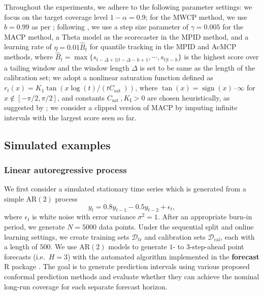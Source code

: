 \documentclass[
  11pt,
  a4paper,
]{article}
\theoremstyle{plain}
\theoremstyle{remark}
\begin{document}
Throughout the experiments, we adhere to the following parameter
settings: we focus on the target coverage level \(1-\alpha=0.9\); for
the MWCP method, we use \(b=0.99\) as per \textcite{barber2023};
following \textcite{angelopoulos2024}, we use a step size parameter of
\(\gamma=0.005\) for the MACP method, a Theta model as the scorecaster
in the MPID method, and a learning rate of \(\eta=0.01\hat{B}_t\) for
quantile tracking in the MPID and AcMCP methods, where
\(\hat{B}_t=\max\{s_{t-\Delta+1|t-\Delta-h+1},\cdots,s_{t|t-h}\}\) is
the highest score over a tailing window and the window length \(\Delta\)
is set to be same as the length of the calibration set; we adopt a
nonlinear saturation function defined as
\(r_t(x)=K_1 \tan \left(x \log (t) /\left(t C_{\text {sat }}\right)\right)\),
where \(\tan (x)=\operatorname{sign}(x) \cdot \infty\) for
\(x \notin[-\pi / 2, \pi / 2]\), and constants
\(C_{\text {sat }}, K_{\mathrm{I}}>0\) are chosen heuristically, as
suggested by \textcite{angelopoulos2024}; we consider a clipped version
of MACP by imputing infinite intervals with the largest score seen so
far.

\subsection{Simulated examples}\label{simulated-examples}

\subsubsection{Linear autoregressive
process}\label{linear-autoregressive-process}

We first consider a simulated stationary time series which is generated
from a simple AR\((2)\) process \[
y_t = 0.8y_{t-1} - 0.5y_{t-2} + \epsilon_t,
\] where \(\epsilon_t\) is white noise with error variance
\(\sigma^2 = 1\). After an appropriate burn-in period, we generate
\(N=5000\) data points. Under the sequential split and online learning
settings, we create training sets \(\mathcal{D}_{\text{tr}}\) and
calibration sets \(\mathcal{D}_{\text{cal}}\), each with a length of
\(500\). We use AR\((2)\) models to generate \(1\)- to \(3\)-step-ahead
point forecasts (i.e.~\(H=3\)) with the automated algorithm implemented
in the \textbf{forecast} R package \autocite{hyndman2024}. The goal is
to generate prediction intervals using various proposed conformal
prediction methods and evaluate whether they can achieve the nominal
long-run coverage for each separate forecast horizon.
\end{document}
